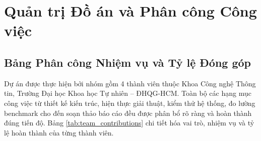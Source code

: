 \section{Quản trị Đồ án và Phân công Công việc}
\label{sec:contribution}

\subsection{Bảng Phân công Nhiệm vụ và Tỷ lệ Đóng góp}
Dự án được thực hiện bởi nhóm gồm 4 thành viên thuộc Khoa Công nghệ
Thông tin, Trường Đại học Khoa học Tự nhiên -- ĐHQG-HCM. Toàn bộ các hạng
mục công việc từ thiết kế kiến trúc, hiện thực giải thuật, kiểm thử
hệ thống, đo lường benchmark cho đến soạn thảo báo cáo đều được phân bổ
rõ ràng và hoàn thành đúng tiến độ. Bảng \ref{tab:team_contributions}
chi tiết hóa vai trò, nhiệm vụ và tỷ lệ hoàn thành của từng thành viên.

